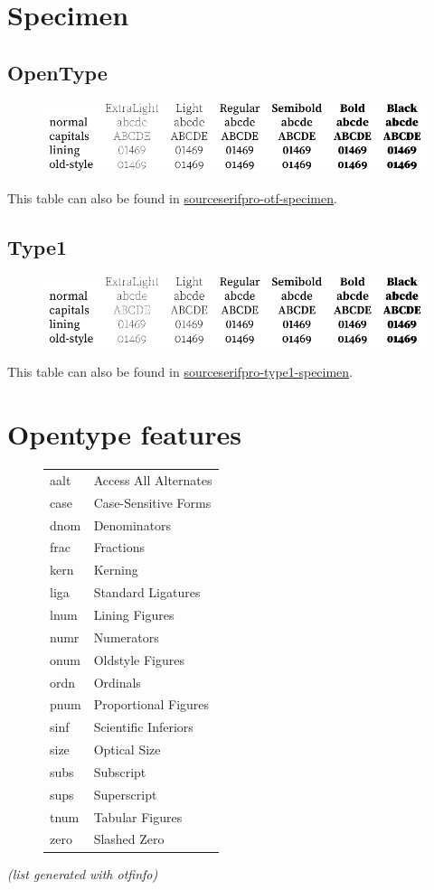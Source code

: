\documentclass[10pt,a4paper,english]{article}
\newcommand*\file[1]{\href{run:#1.pdf}{#1}}
\begin{document}
\section{Specimen}
\label{sec:specimen}
\subsection{OpenType}
\begin{figure}[ht]
	\centering
	\includegraphics{sourceserifpro-otf-specimen}
\end{figure}
This table can also be found in \file{sourceserifpro-otf-specimen}.

\subsection{Type1}
\begin{figure}[ht]
	\centering
	\includegraphics{sourceserifpro-type1-specimen}
\end{figure}
This table can also be found in \file{sourceserifpro-type1-specimen}.

\newpage
\section{Opentype features}
\label{sec:otfinfo}

\begin{figure}[ht]
	\centering
	\begin{tabular}{>{\ttfamily}l l}
		aalt & Access All Alternates \\
		case & Case-Sensitive Forms \\
		dnom & Denominators \\
		frac & Fractions \\
		kern & Kerning \\
		liga & Standard Ligatures \\
		lnum & Lining Figures \\
		numr & Numerators \\
		onum & Oldstyle Figures \\
		ordn & Ordinals \\
		pnum & Proportional Figures \\
		sinf & Scientific Inferiors \\
		size & Optical Size \\
		subs & Subscript \\
		sups & Superscript \\
		tnum & Tabular Figures \\
		zero & Slashed Zero \\
	\end{tabular}
\end{figure}
\textit{(list generated with otfinfo)}
\end{document}
